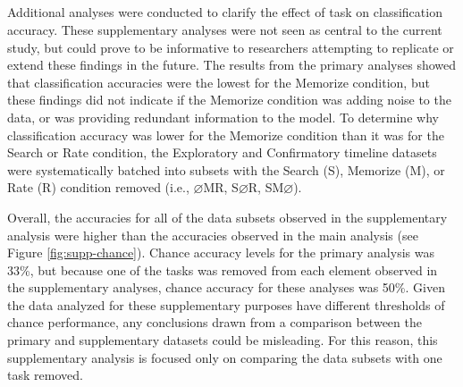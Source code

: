 \documentclass[
  english,
  man,floatsintext]{apa6}
\begin{document}
\endgroup

\clearpage
\makeatletter
\efloat@restorefloats
\makeatother


\begin{appendix}
\hypertarget{section}{%
\section{}\label{section}}

Additional analyses were conducted to clarify the effect of task on
classification accuracy. These supplementary analyses were not seen as
central to the current study, but could prove to be informative to
researchers attempting to replicate or extend these findings in the
future. The results from the primary analyses showed that classification
accuracies were the lowest for the Memorize condition, but these
findings did not indicate if the Memorize condition was adding noise to
the data, or was providing redundant information to the model. To
determine why classification accuracy was lower for the Memorize
condition than it was for the Search or Rate condition, the Exploratory
and Confirmatory timeline datasets were systematically batched into
subsets with the Search (S), Memorize (M), or Rate (R) condition removed
(i.e., \(\varnothing\)MR, S\(\varnothing\)R, SM\(\varnothing\)).

Overall, the accuracies for all of the data subsets observed in the
supplementary analysis were higher than the accuracies observed in the
main analysis (see Figure \ref{fig:supp-chance}). Chance accuracy levels
for the primary analysis was 33\%, but because one of the tasks was
removed from each element observed in the supplementary analyses, chance
accuracy for these analyses was 50\%. Given the data analyzed for these
supplementary purposes have different thresholds of chance performance,
any conclusions drawn from a comparison between the primary and
supplementary datasets could be misleading. For this reason, this
supplementary analysis is focused only on comparing the data subsets
with one task removed.


\end{appendix}
\end{document}

